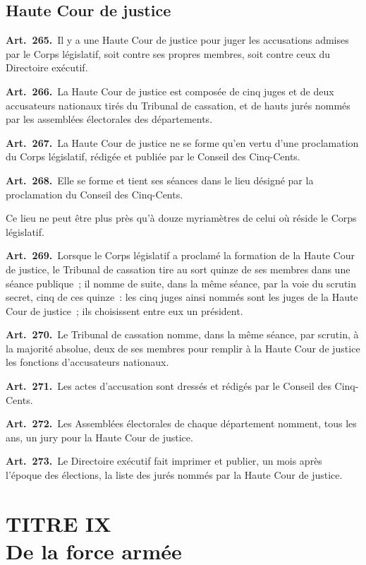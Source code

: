 \documentclass[french,twoside]{book} %
\newcommand{\labelchar}[1]{\textbf{\color{rubric} #1}}
\begin{document}
\subsection[{Haute Cour de justice}]{Haute Cour de justice}

\labelchar{Art. 265.} Il y a une Haute Cour de justice pour juger les accusations admises par le Corps législatif, soit contre ses propres membres, soit contre ceux du Directoire exécutif.\par
\labelchar{Art. 266.} La Haute Cour de justice est composée de cinq juges et de deux accusateurs nationaux tirés du Tribunal de cassation, et de hauts jurés nommés par les assemblées électorales des départements.\par
\labelchar{Art. 267.} La Haute Cour de justice ne se forme qu’en vertu d’une proclamation du Corps législatif, rédigée et publiée par le Conseil des Cinq-Cents.\par
\labelchar{Art. 268.} Elle se forme et tient ses séances dans le lieu désigné par la proclamation du Conseil des Cinq-Cents.\par
Ce lieu ne peut être plus près qu’à douze myriamètres de celui où réside le Corps législatif.\par
\labelchar{Art. 269.} Lorsque le Corps législatif a proclamé la formation de la Haute Cour de justice, le Tribunal de cassation tire au sort quinze de ses membres dans une séance publique ; il nomme de suite, dans la même séance, par la voie du scrutin secret, cinq de ces quinze : les cinq juges ainsi nommés sont les juges de la Haute Cour de justice ; ils choisissent entre eux un président.\par
\labelchar{Art. 270.} Le Tribunal de cassation nomme, dans la même séance, par scrutin, à la majorité absolue, deux de ses membres pour remplir à la Haute Cour de justice les fonctions d’accusateurs nationaux.\par
\labelchar{Art. 271.} Les actes d’accusation sont dressés et rédigés par le Conseil des Cinq-Cents.\par
\labelchar{Art. 272.} Les Assemblées électorales de chaque département nomment, tous les ans, un jury pour la Haute Cour de justice.\par
\labelchar{Art. 273.} Le Directoire exécutif fait imprimer et publier, un mois après l’époque des élections, la liste des jurés nommés par la Haute Cour de justice.

\section[{TITRE IX. De la force armée}]{TITRE IX \\
De la force armée}
\end{document}
